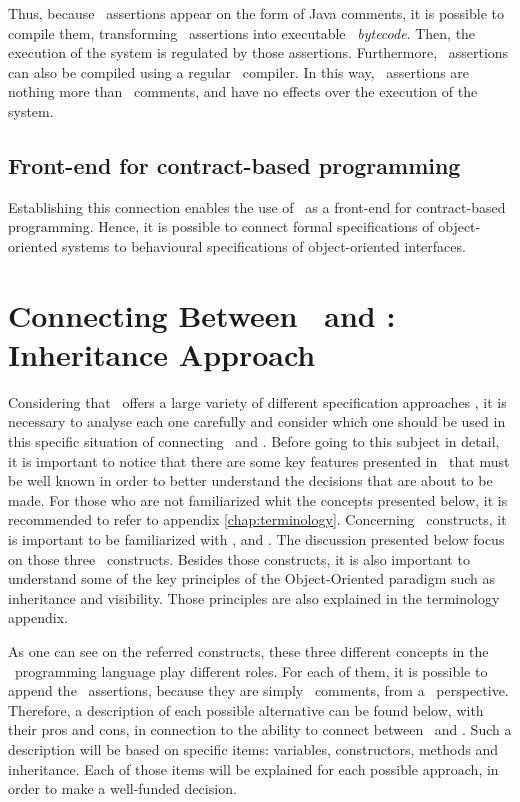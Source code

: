 Thus, because \jml\ assertions appear on the form of Java comments, it is possible to compile them, transforming 
\jml\ assertions into executable \java\ \textit{bytecode}. Then, the execution of the system is regulated by those assertions.
Furthermore, \jml\ assertions can also be compiled using a regular \java\ compiler. In this way, \jml\ assertions 
are nothing more than \java\ comments, and have no effects over the execution of the system.

\subsection{Front-end for contract-based programming}
Establishing this connection enables the use of \vpp\ as a front-end for contract-based programming.
Hence, it is possible to connect formal specifications of object-oriented systems to behavioural 
specifications of object-oriented interfaces.

\section{Connecting Between \vpp\ and \jml : Inheritance Approach}
\label{sec:chapter2:vpptojml}

Considering that \jml\ offers a large variety of different specification approaches \cite{leavens-baker03}, 
it is necessary to analyse each one carefully and consider which one should be used in this specific situation of connecting \vpp\ and \jml. 
Before going to this subject in detail, it is important to notice that there are some key features presented in \java \ 
that must be well known in order to better understand the decisions that are about to be made. 
For those who are not familiarized whit the concepts presented below, it is recommended to refer to appendix \ref{chap:terminology}.
Concerning \java\ constructs, it is important to be familiarized with \writeterm{Abstract Classes}, \writeterm{Classes} and  \cite{devjavasoft}. 
The discussion presented below focus on those three \java\ constructs. 
Besides those constructs, it is also important to understand some of the key principles of the Object-Oriented paradigm such as inheritance and visibility. Those principles are also explained in the terminology appendix.

As one can see on the referred constructs, these three different concepts in the \java\ programming language play different roles. For each of them, it is possible to append the \jml\ assertions, because they are simply \java\ comments, from a \java\ perspective.
Therefore, a description of each possible alternative can be found below, with their pros and cons, in connection to the ability to connect between \vpp\ and \jml. Such a description will be based on specific items: variables, constructors, methods and inheritance. Each of those items will be explained for each possible approach, in order to make a well-funded decision.

